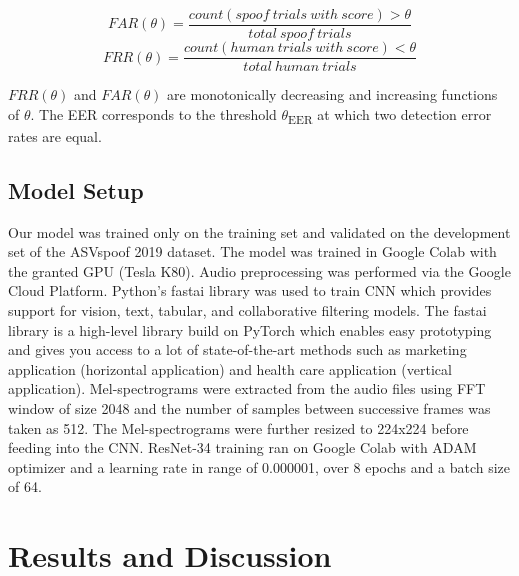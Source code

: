 \documentclass[a4paper]{article}
\begin{document}
    \begin{equation}
        FAR(\theta) = \frac{count(spoof \ trials \ with \ score) > \theta}{total \ spoof \ trials}
    \end{equation}
    \begin{equation}
        FRR(\theta) = \frac{count(human \ trials \ with \ score) < \theta}{total \ human \ trials}
    \end{equation}
    
    $FRR(\theta)$ and $FAR(\theta)$ are monotonically decreasing and increasing functions of $\theta$. The EER corresponds to the threshold $\theta$\textsubscript{EER} at which two detection error rates are equal.

\subsection{Model Setup}
    Our model was trained only on the training set and validated on the development set of the ASVspoof 2019 dataset. The model was trained in Google Colab with the granted GPU (Tesla K80). Audio preprocessing was performed via the Google Cloud Platform. Python's fastai library was used to train CNN which provides support for vision, text, tabular, and collaborative filtering models. The fastai library is a high-level library build on PyTorch which enables easy prototyping and gives you access to a lot of state-of-the-art methods such as marketing application (horizontal application) and health care application (vertical application). Mel-spectrograms were extracted from the audio files using FFT window of size 2048 and the number of samples between successive frames was taken as 512. The Mel-spectrograms were further resized to 224x224 before feeding into the CNN.  ResNet-34 training ran on Google Colab with ADAM optimizer and a learning rate in range of 0.000001, over 8 epochs and a batch size of 64.


\section{Results and Discussion}
\end{document}
